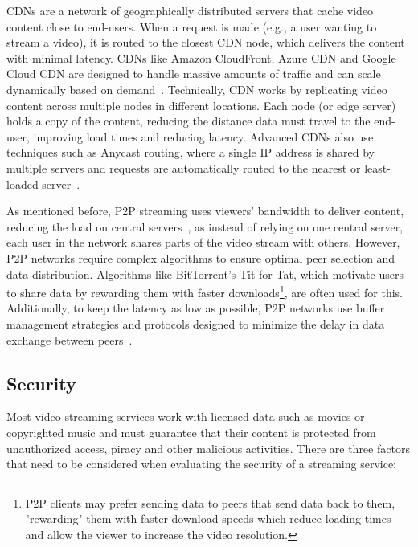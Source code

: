 \ac{CDN}s are a network of geographically distributed servers that cache video content close to end-users. When a request is made (e.g., a user wanting to stream a video), it is routed to the closest \ac{CDN} node, which delivers the content with minimal latency. \ac{CDN}s like Amazon CloudFront, Azure CDN and Google Cloud CDN are designed to handle massive amounts of traffic and can scale dynamically based on demand~\parencite{cdn_basic}.
Technically, \ac{CDN} works by replicating video content across multiple nodes in different locations. Each node (or edge server) holds a copy of the content, reducing the distance data must travel to the end-user, improving load times and reducing latency. Advanced \ac{CDN}s also use techniques such as Anycast routing, where a single IP address is shared by multiple servers and requests are automatically routed to the nearest or least-loaded server~\parencite{cdn_basic}.
    
As mentioned before, \ac{P2P} streaming uses viewers' bandwidth to deliver content, reducing the load on central servers~\parencite{cdn_basic}, as instead of relying on one central server, each user in the network shares parts of the video stream with others.
However, \ac{P2P} networks require complex algorithms to ensure optimal peer selection and data distribution. Algorithms like BitTorrent's Tit-for-Tat, which motivate users to share data by rewarding them with faster downloads\footnote{\ac{P2P} clients may prefer sending data to peers that send data back to them, "rewarding" them with faster download speeds which reduce loading times and allow the viewer to increase the video resolution.}, are often used for this. Additionally, to keep the latency as low as possible, \ac{P2P} networks use buffer management strategies and protocols designed to minimize the delay in data exchange between peers~\parencite{p2p}.

\subsection{Security}

Most video streaming services work with licensed data such as movies or copyrighted music and must guarantee that their content is protected from unauthorized access, piracy and other malicious activities.
There are three factors that need to be considered when evaluating the security of a streaming service: 

